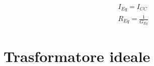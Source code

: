 \documentclass{article}
\begin{document}
\begin{minipage}[t]{.7\textwidth}
\begin{minipage}[t]{.5\textwidth}
\begin{minipage}[t]{.3\textwidth}
                        

                    \end{minipage}
                    \hfill
                    \begin{minipage}[t]{.7\textwidth}

                        \begin{align*}
                            &I_{Eq} = I_{CC}\\
                            &R_{Eq} = \frac{1}{G_{Eq}}
                        \end{align*}

                    \end{minipage}

            \end{minipage}

    \end{minipage}

    \vspace{-2\baselineskip}
    \section*{Trasformatore ideale}
\end{document}
